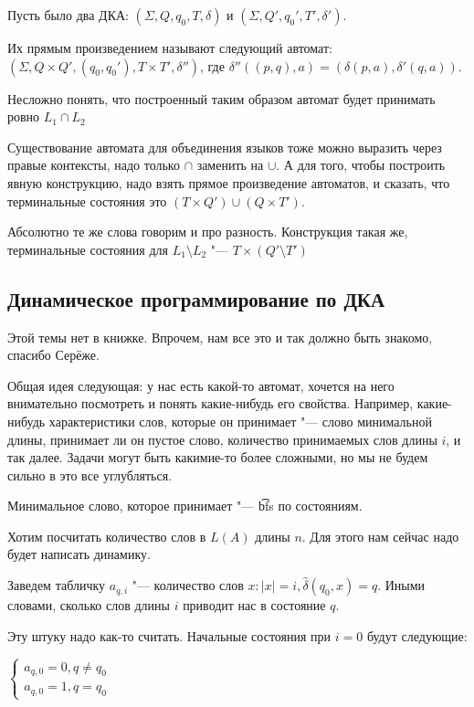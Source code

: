 \begin{Def}
Пусть было два ДКА: $(\Sigma, Q, q_0, T, \delta)$ и $(\Sigma, Q', q_0', T', \delta')$.

Их прямым произведением называют следующий автомат: $(\Sigma, Q \times Q', (q_0, q_0'), T \times T', \delta'')$, где $\delta''((p, q), a) = (\delta(p, a), \delta'(q, a))$.
\end{Def}
Несложно понять, что построенный таким образом автомат будет принимать ровно $L_1 \cap L_2$

Существование автомата для объединения языков тоже можно выразить через правые контексты, надо только $\cap$ заменить на $\cup$. 
А для того, чтобы построить явную конструкцию, надо взять прямое произведение автоматов, и сказать, что терминальные состояния это $(T \times Q') \cup (Q \times T')$.


Абсолютно те же слова говорим и про разность.
Конструкция такая же, терминальные состояния для $L_1 \setminus L_2$ "--- $T \times (Q' \setminus T')$


\subsection{Динамическое программирование по ДКА}
\begin{Rem}
Этой темы нет в книжке. Впрочем, нам все это и так должно быть знакомо, спасибо Серёже.
\end{Rem}

Общая идея следующая: у нас есть какой-то автомат, хочется на него внимательно посмотреть и понять какие-нибудь его свойства. 
Например, какие-нибудь характеристики слов, которые он принимает "--- слово минимальной длины, принимает ли он пустое слово, количество принимаемых слов длины $i$, и так далее.
Задачи могут быть какимие-то более сложными, но мы не будем сильно в это все углубляться.


Минимальное слово, которое принимает "--- \t{bfs} по состояниям.

Хотим посчитать количество слов в $L(A)$ длины $n$. Для этого нам сейчас надо будет написать динамику. 

Заведем табличку $a_{q, i}$ "--- количество слов $x: |x| = i, \hat \delta(q_0, x) = q$. 
Иными словами, сколько слов длины $i$ приводит нас в состояние $q$.

Эту штуку надо как-то считать. Начальные состояния при $i=0$ будут следующие:

$
    \begin{cases}
        a_{q, 0} = 0, q \neq q_0 \\
        a_{q, 0} = 1, q = q_0
    \end{cases} 
$

